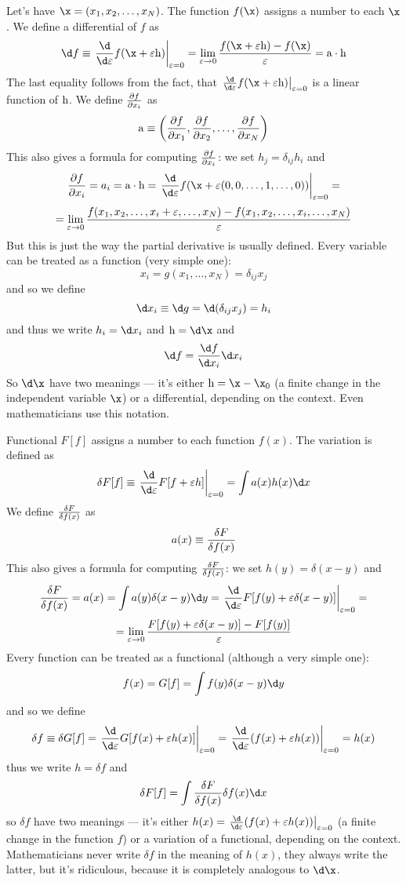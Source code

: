 \def\h{{\rm h}}
\def\a{{\rm a}}
Let's have $\x=(x_1,x_2,\dots,x_N)$. The function $f(\x)$ assigns a number
to each $\x$. We define a differential of $f$ as
$$\d f\equiv \left.{\d\over\d\varepsilon}f(\x+\varepsilon\h)
\right|_{\varepsilon=0}
=\lim_{\varepsilon\to0}
{f(\x+\varepsilon\h)-f(\x)\over\varepsilon}=\a\cdot\h$$
The last equality follows from the fact, that
$\left.{\d\over\d\varepsilon}f(\x+\varepsilon\h) \right|_{\varepsilon=0}$ is a
linear function of $\h$.
We define ${\partial f\over\partial x_i}$ as
$$\a\equiv\left({\partial f\over\partial x_1},{\partial f\over\partial x_2},
\dots,{\partial f\over\partial x_N}\right)$$
This also gives a formula for computing ${\partial f\over\partial x_i}$: we
set $h_j=\delta_{ij}h_i$ and
$${\partial f\over\partial x_i}=a_i=\a\cdot\h=\left.{\d\over\d\varepsilon}
f(\x+\varepsilon(0,0,\dots,1,\dots,0))\right|_{\varepsilon=0}=$$
$$=\lim_{\varepsilon\to0}
{f(x_1,x_2,\dots,x_i+\varepsilon,\dots,x_N)-f(x_1,x_2,\dots,x_i,\dots,x_N)
\over\varepsilon}$$
But this is just the way the partial derivative is usually defined.
Every variable can be treated as a function (very simple one):
$$x_i=g(x_1,\dots,x_N)=\delta_{ij}x_j$$
and so we define
$$\d x_i\equiv\d g=\d(\delta_{ij}x_j)=h_i$$
and thus we write $h_i=\d x_i$ and $\h=\d\x$ and 
$$\d f={\d f\over\d x_i}\d x_i$$
So $\d\x$ have two meanings --- it's either $\h=\x-\x_0$ (a finite change in
the independent variable $\x$) or a differential,
depending on the context. Even mathematicians use this notation.

Functional $F[f]$ assigns a number to each function $f(x)$. The variation is
defined as 
$$\delta F[f]\equiv\left.{\d\over\d\varepsilon}F[f+\varepsilon h]
\right|_{\varepsilon=0}=\int a(x)h(x)\d x$$
We define ${\delta F\over\delta f(x)}$ as
$$a(x)\equiv{\delta F\over\delta f(x)}$$
This also gives a formula for computing ${\delta F\over\delta f(x)}$: we
set $h(y)=\delta(x-y)$ and
$${\delta F\over\delta f(x)}=a(x)=\int a(y)\delta(x-y)\d y=
\left.{\d\over\d\varepsilon}F[f(y)+\varepsilon\delta(x-y)]
\right|_{\varepsilon=0}=$$
$$=\lim_{\varepsilon\to0}
{F[f(y)+\varepsilon\delta(x-y)]-F[f(y)]\over\varepsilon}$$
Every function can be treated as a functional (although a very simple one):
$$f(x)=G[f]=\int f(y)\delta(x-y)\d y$$
and so we define
$$\delta f\equiv\delta G[f]=
\left.{\d\over\d\varepsilon}G[f(x)+\varepsilon h(x)]
\right|_{\varepsilon=0}=
\left.{\d\over\d\varepsilon}(f(x)+\varepsilon h(x))
\right|_{\varepsilon=0}=
h(x)$$
thus we write $h=\delta f$ and
$$\delta F[f]=\int {\delta F\over\delta f(x)}\delta f(x)\d x$$
so $\delta f$ have two meanings --- it's either 
$h(x)=\left.{\d\over\d\varepsilon}(f(x)+\varepsilon h(x))
\right|_{\varepsilon=0}$
(a finite change in the
function $f$) or a variation of a functional, depending on the context.
Mathematicians never write $\delta f$ in the meaning of $h(x)$, they always
write the latter, but it's ridiculous, because it is completely analogous to
$\d\x$.

